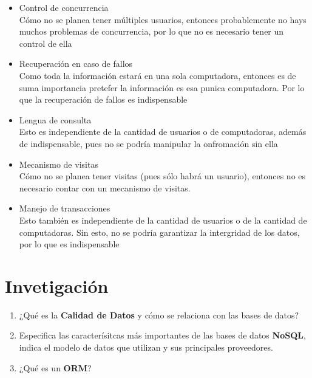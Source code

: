 \documentclass{article}
\begin{document}
\begin{enumerate}[label=\alph*.]
{\begin{itemize}
{                Esto es inclusive independiente del tipo de sistema que se 
                tenga. La seguridad es indispensable, y más aún al ser un 
                negocio, pues manejan información delicada acerca de clientes,
                proveedores, empleados, entre otros.}
                \item {Control de concurrencia \\
                Cómo no se planea tener múltiples usuarios, entonces probablemente
                no hays muchos problemas de concurrencia, por lo que no es 
                necesario tener un control de ella}
                \item {Recuperación en caso de fallos \\
                Como toda la información estará en una sola computadora, 
                entonces es de suma importancia pretefer la información es esa 
                punica computadora. Por lo que la recuperación de fallos es 
                indispensable}
                \item {Lengua de consulta \\
                Esto es independiente de la cantidad de usuarios o de 
                computadoras, además de indispensable, pues no se podría 
                manipular la onfromación sin ella}
                \item {Mecanismo de visitas \\
                Cómo no se planea tener visitas (pues sólo habrá un usuario), 
                entonces no es necesario contar con un mecanismo de visitas.
                }
                \item {Manejo de transacciones \\
                Esto también es independiente de la cantidad de usuarios o de la
                cantidad de computadoras. Sin esto, no se podría garantizar la 
                intergridad de los datos, por lo que es indispensable}
            \end{itemize}
        }
    \end{enumerate}

    \section{Invetigación}
    \begin{enumerate}[label=\alph*.]
        \item {
            ¿Qué es la \textbf{Calidad de Datos} y cómo se relaciona con las 
            bases de datos?
        }
        \item {
            Especifica las caracterísitcas más importantes de las bases de datos
            \textbf{NoSQL}, indica el modelo de datos que utilizan y sus 
            principales proveedores.
        }
        \item {
            ¿Qué es un \textbf{ORM}?
        }
    \end{enumerate}
\end{document}
